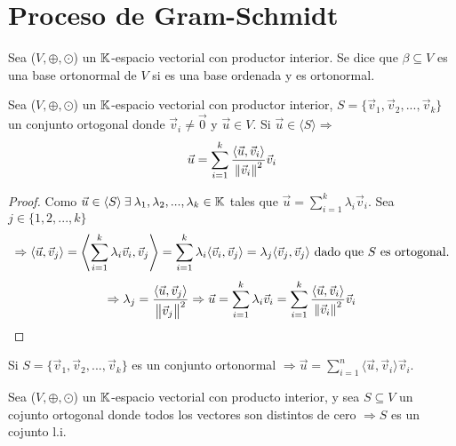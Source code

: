 \section{Proceso de Gram-Schmidt}

\begin{definition} 
     Sea ($V, \oplus, \odot$) un $\mathbb{K}$-espacio vectorial con productor interior. Se dice que $\beta \subseteq V$ es una base ortonormal de $V$ si es una base ordenada y es ortonormal. 
\end{definition}

\begin{theorem}
     Sea ($V, \oplus, \odot$) un $\mathbb{K}$-espacio vectorial con productor interior, $S=\{\vec{v}_1,\vec{v}_2,...,\vec{v}_k\}$ un conjunto ortogonal donde $\vec{v}_i\neq \vec{0}$ y $\vec{u}\in V$. Si $\vec{u} \in \langle S \rangle \Rightarrow$ $$\vec{u}=\sum_{i=1}^k \frac{\langle \vec{u},\vec{v}_i \rangle}{\norm{\vec{v}_i}^2} \vec{v}_i $$
\end{theorem}

\begin{proof}
    Como $\vec{u} \in \langle S \rangle \: \exists \: \lambda_1, \lambda_2,...,\lambda_k \in \mathbb{K}$ tales que $\vec{u}=\sum_{i=1}^k\lambda_i \vec{v}_i$. Sea $j \in \{1,2,...,k\}$
        $$\Rightarrow \langle \vec{u}, \vec{v}_j \rangle = \left\langle \sum_{i=1}^k \lambda_i \vec{v}_i, \vec{v}_j \right\rangle = \sum_{i=1}^k \lambda_i\langle\vec{v}_i, \vec{v}_j \rangle  \\
        = \lambda_j \langle \vec{v}_j, \vec{v}_j \rangle \ \text{dado que} \ S \ \text{es ortogonal.}$$ $$\Rightarrow \lambda_j=\frac{\langle  \vec{u}, \vec{v}_j \rangle }{\norm{\vec{v}_j}^2} \Rightarrow \vec{u}=\sum_{i=1}^k\lambda_i \vec{v}_i=\sum_{i=1}^k \frac{\langle \vec{u},\vec{v}_i \rangle}{\norm{\vec{v}_i}^2} \vec{v}_i$$
\end{proof}

\begin{corollary}
    Si $S=\{\vec{v}_1,\vec{v}_2,...,\vec{v}_k\}$ es un conjunto ortonormal $\Rightarrow \vec{u}=\sum\limits_{i=1}^n\langle \vec{u}, \vec{v}_i \rangle \vec{v}_i$.
\end{corollary}

\begin{corollary}
    Sea  ($V, \oplus, \odot$) un $\mathbb{K}$-espacio vectorial con producto interior, y sea $S \subseteq V$ un cojunto ortogonal donde todos los vectores son distintos de cero $\Rightarrow S$ es un cojunto l.i.
\end{corollary}

